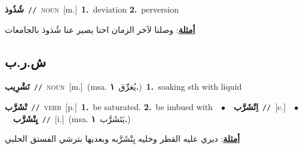 \documentclass[10pt,a4paper,twoside]{article} %
\begin{document}
\begin{multicols}{2}
{\setlength\topsep{0pt}\textbf{\foreignlanguage{arabic}{شُذُوذ}}\ {\color{gray}\texttt{//}\color{black}}\ \textsc{noun}\ [m.]\ \textbf{1.}~deviation  \textbf{2.}~perversion\  \begin{flushright}\color{gray}\foreignlanguage{arabic}{\textbf{\underline{\foreignlanguage{arabic}{أمثلة}}}: وصلنا لآخر الزمان احنا يصير عنا شُذوذ بالجامعات}\end{flushright}\color{black}} \vspace{2mm}

\vspace{-3mm}
\subsection*{\color{blue}\foreignlanguage{arabic}{ش.ر.ب}\color{blue}{}} 

{\setlength\topsep{0pt}\textbf{\foreignlanguage{arabic}{تَشْرِيب}}\ {\color{gray}\texttt{//}\color{black}}\ \textsc{noun}\ [m.]\ \color{gray}(msa. \foreignlanguage{arabic}{يُغرِّق}~\foreignlanguage{arabic}{\textbf{١.}})\color{black}\ \textbf{1.}~soaking sth with liquid\ } \vspace{2mm}

{\setlength\topsep{0pt}\textbf{\foreignlanguage{arabic}{تْشَرَّب}}\ {\color{gray}\texttt{//}\color{black}}\ \textsc{verb}\ [p.]\ \textbf{1.}~be saturated.  \textbf{2.}~be imbued with\ \ $\bullet$\ \ \setlength\topsep{0pt}\textbf{\foreignlanguage{arabic}{اِتْشَرَّب}}\ {\color{gray}\texttt{//}\color{black}}\ [c.]\ \ $\bullet$\ \ \setlength\topsep{0pt}\textbf{\foreignlanguage{arabic}{يِتْشَرَّب}}\ {\color{gray}\texttt{//}\color{black}}\ [i.]\ \color{gray}(msa. \foreignlanguage{arabic}{يَتَشَرَّب}~\foreignlanguage{arabic}{\textbf{١.}})\color{black}\  \begin{flushright}\color{gray}\foreignlanguage{arabic}{\textbf{\underline{\foreignlanguage{arabic}{أمثلة}}}: ديري عليه القطر وخليه يِتْشَرَّبه وبعديها بترشي الفستق الحلبي}\end{flushright}\color{black}} \vspace{2mm}


\end{multicols}
\end{document}
